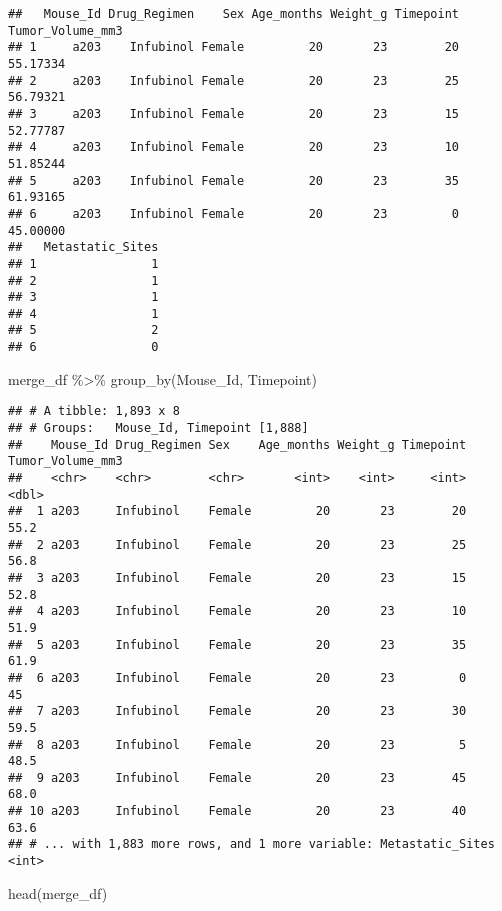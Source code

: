 \documentclass[
]{article}
\newenvironment{Shaded}{\begin{snugshade}}{\end{snugshade}}
\newcommand{\FunctionTok}[1]{\textcolor[rgb]{0.00,0.00,0.00}{#1}}
\newcommand{\NormalTok}[1]{#1}
\newcommand{\SpecialCharTok}[1]{\textcolor[rgb]{0.00,0.00,0.00}{#1}}
\begin{document}
\begin{verbatim}
##   Mouse_Id Drug_Regimen    Sex Age_months Weight_g Timepoint Tumor_Volume_mm3
## 1     a203    Infubinol Female         20       23        20         55.17334
## 2     a203    Infubinol Female         20       23        25         56.79321
## 3     a203    Infubinol Female         20       23        15         52.77787
## 4     a203    Infubinol Female         20       23        10         51.85244
## 5     a203    Infubinol Female         20       23        35         61.93165
## 6     a203    Infubinol Female         20       23         0         45.00000
##   Metastatic_Sites
## 1                1
## 2                1
## 3                1
## 4                1
## 5                2
## 6                0
\end{verbatim}

\begin{Shaded}
\begin{Highlighting}[]
\NormalTok{merge\_df }\SpecialCharTok{\%\textgreater{}\%} \FunctionTok{group\_by}\NormalTok{(Mouse\_Id, Timepoint)}
\end{Highlighting}
\end{Shaded}

\begin{verbatim}
## # A tibble: 1,893 x 8
## # Groups:   Mouse_Id, Timepoint [1,888]
##    Mouse_Id Drug_Regimen Sex    Age_months Weight_g Timepoint Tumor_Volume_mm3
##    <chr>    <chr>        <chr>       <int>    <int>     <int>            <dbl>
##  1 a203     Infubinol    Female         20       23        20             55.2
##  2 a203     Infubinol    Female         20       23        25             56.8
##  3 a203     Infubinol    Female         20       23        15             52.8
##  4 a203     Infubinol    Female         20       23        10             51.9
##  5 a203     Infubinol    Female         20       23        35             61.9
##  6 a203     Infubinol    Female         20       23         0             45  
##  7 a203     Infubinol    Female         20       23        30             59.5
##  8 a203     Infubinol    Female         20       23         5             48.5
##  9 a203     Infubinol    Female         20       23        45             68.0
## 10 a203     Infubinol    Female         20       23        40             63.6
## # ... with 1,883 more rows, and 1 more variable: Metastatic_Sites <int>
\end{verbatim}

\begin{Shaded}
\begin{Highlighting}[]
\FunctionTok{head}\NormalTok{(merge\_df)}
\end{Highlighting}
\end{Shaded}
\end{document}
